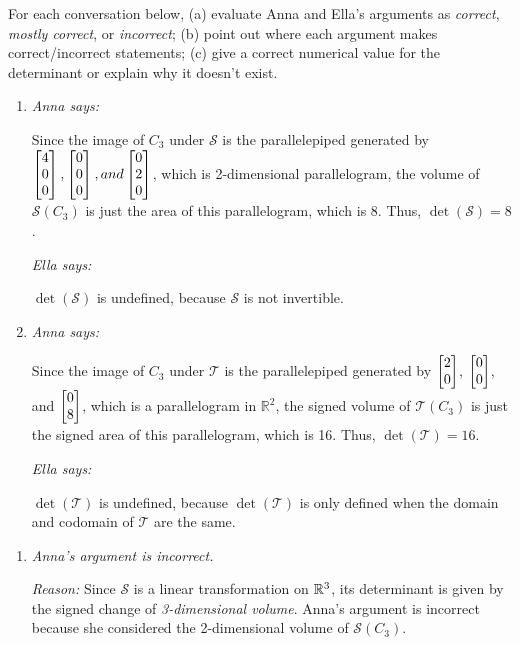 \begin{exercises}
\begin{problist}
		For each conversation below, (a) evaluate Anna and Ella's arguments as \emph{correct},
		\emph{mostly correct}, or \emph{incorrect}; (b) point out where each argument
		makes correct/incorrect statements; (c) give a correct numerical value
		for the determinant or explain why it doesn't exist.
		\begin{enumerate}
			\item \emph{Anna says:}

				Since the image of $C_{3}$ under $\mathcal{S}$ is the
				parallelepiped generated by
				$\mat{4 \\ 0 \\ 0},\mat{0 \\ 0 \\ 0}, and \mat{0 \\ 2 \\ 0}$, which
				is 2-dimensional parallelogram, the volume of
				$\mathcal{S}(C_{3})$ is just the area of this parallelogram, which
				is 8. Thus, $\det(\mathcal{S})=8$.

				\emph{Ella says:}

				$\det(\mathcal{S})$ is undefined, because $\mathcal{S}$ is not
				invertible.

			\item \emph{Anna says:}

				Since the image of $C_{3}$ under $\mathcal{T}$ is the
				parallelepiped generated by $\mat{2 \\ 0}$, $\mat{0 \\ 0}$, and
				$\mat{0 \\ 8}$, which is a parallelogram in $\mathbb{R}^{2}$,
				the signed volume of $\mathcal{T}(C_{3})$ is just the signed
				area of this parallelogram, which is 16. Thus,
				$\det(\mathcal{T})=16$.

				\emph{Ella says:}

				$\det(\mathcal{T})$ is undefined, because $\det(\mathcal{T})$ is
				only defined when the domain and codomain of $\mathcal{T}$ are
				the same.
		\end{enumerate}
		\begin{solution}
			\begin{enumerate}
				\item \emph{Anna's argument is incorrect.}

					\emph{Reason:} Since $\mathcal{S}$ is a linear
					transformation on $\mathbb{R}^{3}$, its determinant is given by the signed
					change of \emph{3-dimensional volume}. Anna's argument is incorrect
					because she considered the 2-dimensional volume of $\mathcal{S}
					(C_{3})$.


\end{enumerate}
\end{solution}
\end{problist}
\end{exercises}

